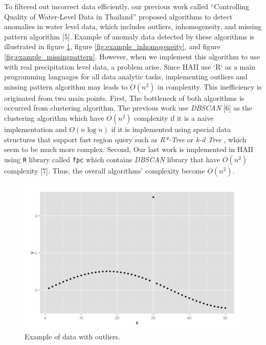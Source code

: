 \documentclass[conference]{IEEEtran}
\begin{document}
To filtered out incorrect data efficiently, our previous work called “Controlling Quality of Water-Level Data in Thailand” proposed algorithms to detect anomalies in water level data, which includes outliers, inhomogeneity, and missing pattern algorithm [5]. Example of anomaly data detected by these algorithms is illustrated in figure \ref{fig:example_outliers}, figure \ref{fig:example_inhomogeneity}, and figure \ref{fig:example_missingpattern}. However, when we implement this algorithm to use with real precipitation level data, a problem arise. Since HAII use `R` as a main programming languages for all data analytic tasks, implementing outliers and missing pattern algorithm may leads to $O(n^2)$ in complexity. This inefficiency is originated from two main points. First, The bottleneck of both algorithms is occurred from clustering algorithm. The previous work use \textit{DBSCAN} [6] as the clustering algorithm which have $O(n^2)$ complexity if it is a naive implementation and $O(n\log{n})$ if it is implemented using special data structures that support fast region query such as \textit{R*-Tree} or \textit{k-d Tree} , which seem to be much more complex. Second, Our last work is implemented in HAII using \texttt{R} library called \texttt{fpc} which contains \textit{DBSCAN} library that have $O(n^2)$ complexity [7]. Thus, the overall algorithms’ complexity become $O(n^2)$.

\begin{figure}
	\includegraphics[width=\linewidth]{figure1.png}
	\caption{Example of data with outliers.}
	\label{fig:example_outliers}
\end{figure}
\end{document}
